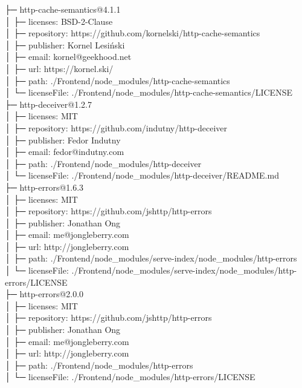 ├─ http-cache-semantics@4.1.1\\
│  ├─ licenses: BSD-2-Clause\\
│  ├─ repository: https://github.com/kornelski/http-cache-semantics\\
│  ├─ publisher: Kornel Lesiński\\
│  ├─ email: kornel@geekhood.net\\
│  ├─ url: https://kornel.ski/\\
│  ├─ path: ./Frontend/node\_modules/http-cache-semantics\\
│  └─ licenseFile: ./Frontend/node\_modules/http-cache-semantics/LICENSE\\
├─ http-deceiver@1.2.7\\
│  ├─ licenses: MIT\\
│  ├─ repository: https://github.com/indutny/http-deceiver\\
│  ├─ publisher: Fedor Indutny\\
│  ├─ email: fedor@indutny.com\\
│  ├─ path: ./Frontend/node\_modules/http-deceiver\\
│  └─ licenseFile: ./Frontend/node\_modules/http-deceiver/README.md\\
├─ http-errors@1.6.3\\
│  ├─ licenses: MIT\\
│  ├─ repository: https://github.com/jshttp/http-errors\\
│  ├─ publisher: Jonathan Ong\\
│  ├─ email: me@jongleberry.com\\
│  ├─ url: http://jongleberry.com\\
│  ├─ path: ./Frontend/node\_modules/serve-index/node\_modules/http-errors\\
│  └─ licenseFile: ./Frontend/node\_modules/serve-index/node\_modules/http-errors/LICENSE\\
├─ http-errors@2.0.0\\
│  ├─ licenses: MIT\\
│  ├─ repository: https://github.com/jshttp/http-errors\\
│  ├─ publisher: Jonathan Ong\\
│  ├─ email: me@jongleberry.com\\
│  ├─ url: http://jongleberry.com\\
│  ├─ path: ./Frontend/node\_modules/http-errors\\
│  └─ licenseFile: ./Frontend/node\_modules/http-errors/LICENSE\\
